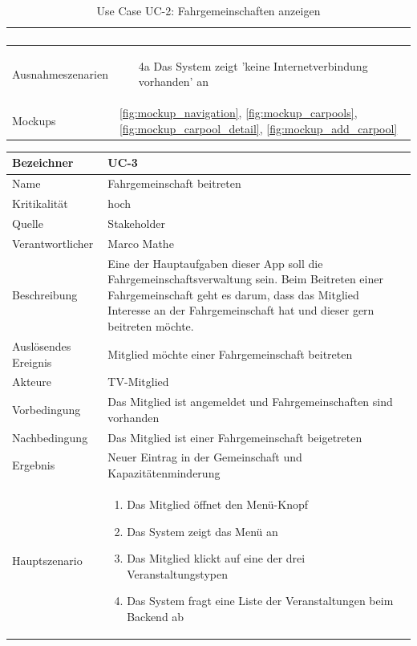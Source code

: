 \begin{table}[ht]
\begin{tabular}{ l | p{10cm} }
\begin{enumerate}
					\end{enumerate}
					\\ \hline
	Ausnahmeszenarien&	\begin{enumerate}
					\item[4a] Das System zeigt 'keine Internetverbindung vorhanden' an
					\end{enumerate}
					\\ \hline
	Mockups	 	&	\ref{fig:mockup_navigation}, \ref{fig:mockup_carpools}, \ref{fig:mockup_carpool_detail},
					\ref{fig:mockup_add_carpool}
  \end{tabular}
   \caption{Use Case UC-2: Fahrgemeinschaften anzeigen}\label{table:use_case_2}
\end{table}


\begin{table}[ht]
\centering
  \begin{tabular}{ l | p{10cm} }
	\hline
	\rowcolor{gray}
	Bezeichner		&	UC-3\\ \hline
	Name			&	Fahrgemeinschaft beitreten\\ \hline
	Kritikalität		&	hoch\\ \hline
	Quelle			&	Stakeholder\\ \hline
	Verantwortlicher	&	Marco Mathe\\ \hline
	Beschreibung	&	Eine der Hauptaufgaben dieser App soll die Fahrgemeinschaftsverwaltung sein. Beim Beitreten einer Fahrgemeinschaft geht es darum, dass das Mitglied Interesse an der Fahrgemeinschaft hat und dieser gern beitreten möchte.\\ \hline
	Auslösendes Ereignis&	Mitglied möchte einer Fahrgemeinschaft beitreten\\ \hline
	Akteure		&	TV-Mitglied\\ \hline
	Vorbedingung	&	Das Mitglied ist angemeldet und Fahrgemeinschaften sind vorhanden\\ \hline
	Nachbedingung	&	Das Mitglied ist einer Fahrgemeinschaft beigetreten\\ \hline
	Ergebnis		&	Neuer Eintrag in der Gemeinschaft und Kapazitätenminderung\\ \hline
	Hauptszenario	&	\begin{enumerate}
					\item Das Mitglied öffnet den Menü-Knopf
					\item Das System zeigt das Menü an
					\item Das Mitglied klickt auf eine der drei Veranstaltungstypen
					\item Das System fragt eine Liste der Veranstaltungen beim Backend ab

\end{enumerate}
\end{tabular}
\end{table}
